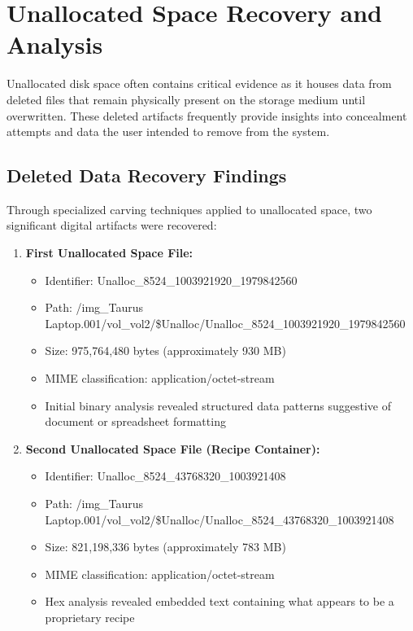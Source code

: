 \section{Unallocated Space Recovery and Analysis}
Unallocated disk space often contains critical evidence as it houses data from deleted files that remain physically present on the storage medium until overwritten. These deleted artifacts frequently provide insights into concealment attempts and data the user intended to remove from the system.

\subsection{Deleted Data Recovery Findings}
Through specialized carving techniques applied to unallocated space, two significant digital artifacts were recovered:

\begin{enumerate}
    \item \textbf{First Unallocated Space File:}
    \begin{itemize}
        \item Identifier: Unalloc\_8524\_1003921920\_1979842560
        \item Path: /img\_Taurus Laptop.001/vol\_vol2/\$Unalloc/Unalloc\_8524\_1003921920\_1979842560
        \item Size: 975,764,480 bytes (approximately 930 MB)
        \item MIME classification: application/octet-stream
        \item Initial binary analysis revealed structured data patterns suggestive of document or spreadsheet formatting
    \end{itemize}
    
    \item \textbf{Second Unallocated Space File (Recipe Container):}
    \begin{itemize}
        \item Identifier: Unalloc\_8524\_43768320\_1003921408
        \item Path: /img\_Taurus Laptop.001/vol\_vol2/\$Unalloc/Unalloc\_8524\_43768320\_1003921408
        \item Size: 821,198,336 bytes (approximately 783 MB)
        \item MIME classification: application/octet-stream
        \item Hex analysis revealed embedded text containing what appears to be a proprietary recipe
    \end{itemize}
\end{enumerate}

